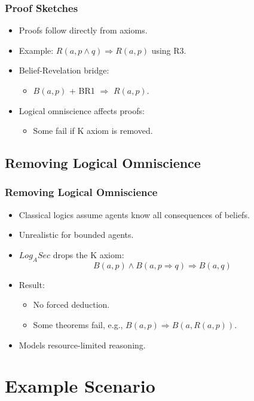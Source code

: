 \documentclass[aspectratio=169]{beamer}
\begin{document}
\begin{frame}
\frametitle{Proof Sketches}
\begin{itemize}
    \item Proofs follow directly from axioms.
    \item Example: $R(a, p \wedge q) \Rightarrow R(a, p)$ using R3.
    \item Belief-Revelation bridge:
    \begin{itemize}
        \item $B(a, p)$ + BR1 $\Rightarrow$ $R(a, p)$.
    \end{itemize}
    \item Logical omniscience affects proofs:
    \begin{itemize}
        \item Some fail if K axiom is removed.
    \end{itemize}
\end{itemize}
\end{frame}

\subsection{Removing Logical Omniscience}
\begin{frame}
\frametitle{Removing Logical Omniscience}
\begin{itemize}
    \item Classical logics assume agents know all consequences of beliefs.
    \item Unrealistic for bounded agents.
    \item $Log_ASec$ drops the K axiom:
    \[
    B(a, p) \wedge B(a, p \Rightarrow q) \Rightarrow B(a, q)
    \]
    \item Result:
    \begin{itemize}
        \item No forced deduction.
        \item Some theorems fail, e.g., $B(a, p) \Rightarrow B(a, R(a, p))$.
    \end{itemize}
    \item Models resource-limited reasoning.
\end{itemize}
\end{frame}



\section{Example Scenario}
\end{document}
